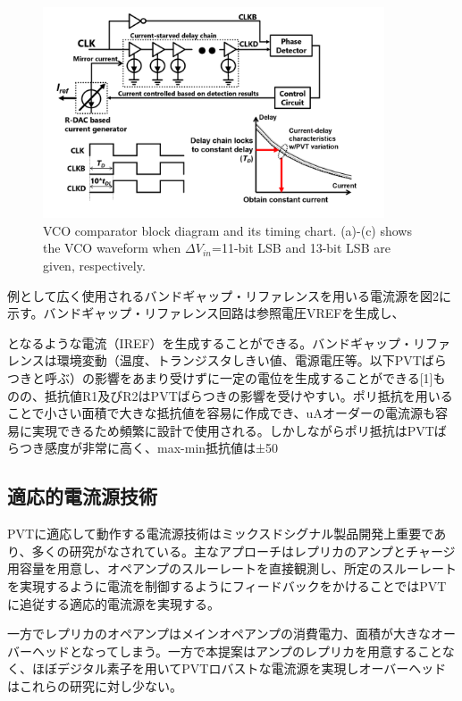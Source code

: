 \documentclass[letterpaper, 10 pt, conference]{ieeeconf}  %
\begin{document}
\begin{figure}[!]
\centering
 \includegraphics[width=0.9\textwidth]{figs/fig2.png}
  \caption{VCO comparator block diagram and its timing chart. (a)-(c) shows the VCO waveform when $\Delta V_{in}$=11-bit LSB and 13-bit LSB are given, respectively.}
  \label{schema}
\end{figure}

例として広く使用されるバンドギャップ・リファレンスを用いる電流源を図2に示す。バンドギャップ・リファレンス回路は参照電圧VREFを生成し、


となるような電流（IREF）を生成することができる。バンドギャップ・リファレンスは環境変動（温度、トランジスタしきい値、電源電圧等。以下PVTばらつきと呼ぶ）の影響をあまり受けずに一定の電位を生成することができる[1]ものの、抵抗値R1及びR2はPVTばらつきの影響を受けやすい。ポリ抵抗を用いることで小さい面積で大きな抵抗値を容易に作成でき、uAオーダーの電流源も容易に実現できるため頻繁に設計で使用される。しかしながらポリ抵抗はPVTばらつき感度が非常に高く、max-min抵抗値は±50%

\subsection{適応的電流源技術}


PVTに適応して動作する電流源技術はミックスドシグナル製品開発上重要であり、多くの研究がなされている。主なアプローチはレプリカのアンプとチャージ用容量を用意し、オペアンプのスルーレートを直接観測し、所定のスルーレートを実現するように電流を制御するようにフィードバックをかけることではPVTに追従する適応的電流源を実現する。

一方でレプリカのオペアンプはメインオペアンプの消費電力、面積が大きなオーバーヘッドとなってしまう。一方で本提案はアンプのレプリカを用意することなく、ほぼデジタル素子を用いてPVTロバストな電流源を実現しオーバーヘッドはこれらの研究に対し少ない。
\end{document}
